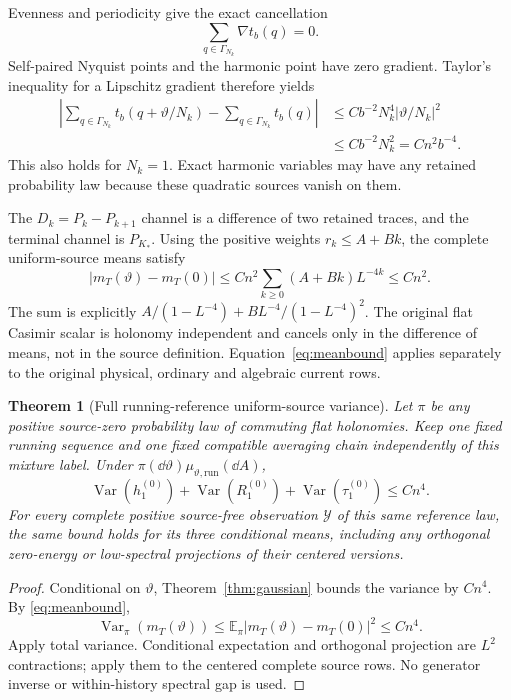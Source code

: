 \documentclass[11pt,letterpaper]{article}
\newtheorem{theorem}{Theorem}[section]
\theoremstyle{remark}\newtheorem{remark}[theorem]{Remark}
\newcommand{\E}{\mathbb E}
\newcommand{\Var}{\operatorname{Var}}\newcommand{\Cov}{\operatorname{Cov}}
\begin{document}
Evenness and periodicity give the exact cancellation
\[
 \sum_{q\in\Gamma_{N_k}}\nabla t_b(q)=0.
\]
Self-paired Nyquist points and the harmonic point have zero gradient. Taylor's inequality for a Lipschitz gradient therefore yields
\begin{align}\label{eq:twisttrace}
 \left|\sum_{q\in\Gamma_{N_k}}t_b(q+\vartheta/N_k)
       -\sum_{q\in\Gamma_{N_k}}t_b(q)\right|
 &\le Cb^{-2}N_k^4|\vartheta/N_k|^2\\
 &\le Cb^{-2}N_k^2=Cn^2b^{-4}.\nonumber
\end{align}
This also holds for \(N_k=1\). Exact harmonic variables may have any retained probability law because these quadratic sources vanish on them.

The \(D_k=P_k-P_{k+1}\) channel is a difference of two retained traces, and the terminal channel is \(P_{K_*}\). Using the positive weights \(r_k\le A+Bk\), the complete uniform-source means satisfy
\begin{equation}\label{eq:meanbound}
 |m_T(\vartheta)-m_T(0)|
 \le Cn^2\sum_{k\ge0}(A+Bk)L^{-4k}\le Cn^2.
\end{equation}
The sum is explicitly
\(A/(1-L^{-4})+BL^{-4}/(1-L^{-4})^2\). The original flat Casimir scalar is holonomy independent and cancels only in the difference of means, not in the source definition. Equation~\eqref{eq:meanbound} applies separately to the original physical, ordinary and algebraic current rows.

\begin{theorem}[Full running-reference uniform-source variance]\label{thm:mixture}
Let \(\pi\) be any positive source-zero probability law of commuting flat holonomies. Keep one fixed running sequence and one fixed compatible averaging chain independently of this mixture label. Under
\(\pi(\dd\vartheta)\mu_{\vartheta,\mathrm{run}}(\dd A)\),
\begin{equation}\label{eq:mixturevariance}
 \boxed{\quad
 \Var(h_1^{(0)})+\Var(R_1^{(0)})+\Var(\tau_1^{(0)})\le Cn^4.
 \quad}
\end{equation}
For every complete positive source-free observation \(\mathcal Y\) of this same reference law, the same bound holds for its three conditional means, including any orthogonal zero-energy or low-spectral projections of their centered versions.
\end{theorem}
\begin{proof}
Conditional on \(\vartheta\), Theorem~\ref{thm:gaussian} bounds the variance by \(Cn^4\). By \eqref{eq:meanbound},
\[
 \Var_\pi(m_T(\vartheta))
 \le\E_\pi|m_T(\vartheta)-m_T(0)|^2\le Cn^4.
\]
Apply total variance. Conditional expectation and orthogonal projection are \(L^2\) contractions; apply them to the centered complete source rows. No generator inverse or within-history spectral gap is used.
\end{proof}
\end{document}
